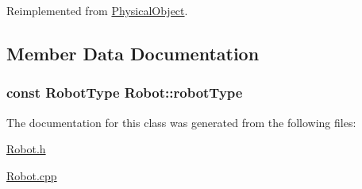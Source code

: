 Reimplemented from \hyperlink{classPhysicalObject_a4fc8c0c62b8e12a63ebdf13136d577ac}{Physical\-Object}.



\subsection{Member Data Documentation}
\hypertarget{classRobot_a49eb06af6d6981c941a24edc54210316}{
\subsubsection[{robot\-Type}]{\setlength{\rightskip}{0pt plus 5cm}const {\bf Robot\-Type} Robot\-::robot\-Type}}\label{classRobot_a49eb06af6d6981c941a24edc54210316}


The documentation for this class was generated from the following files\-:\begin{DoxyCompactItemize}
\item 
\hyperlink{Robot_8h}{Robot.\-h}\item 
\hyperlink{Robot_8cpp}{Robot.\-cpp}\end{DoxyCompactItemize}
